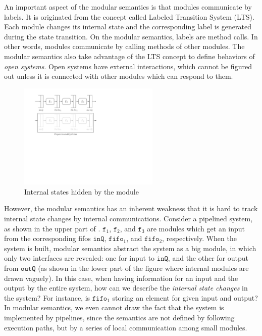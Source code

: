 An important aspect of the modular semantics is that modules
communicate by labels. It is originated from the concept called
Labeled Transition System (LTS). Each module changes its internal
state and the corresponding label is generated during the state
transition. On the modular semantics, labels are method calls. In
other words, modules communicate by calling methods of other modules.
The modular semantics also take advantage of the LTS concept to define
behaviors of \emph{open systems}. Open systems have external
interactions, which cannot be figured out unless it is connected with
other modules which can respond to them.

\begin{figure}[t]
  \centering
  \includegraphics[width=0.6\textwidth]{figures/pipeline-internal.pdf}
  \caption{Internal states hidden by the module}
  \label{ex-modular-semantics-disadvantage}
\end{figure}

However, the modular semantics has an inherent weakness that it is
hard to track internal state changes by internal communications.
Consider a pipelined system, as shown in the upper part of
. $\texttt{f}_1$,
$\texttt{f}_2$, and $\texttt{f}_3$ are modules which get an input from
the corresponding fifos $\texttt{inQ}$, $\texttt{fifo}_1$, and
$\texttt{fifo}_2$, respectively. When the system is built, modular
semantics abstract the system as a big module, in which only two
interfaces are revealed: one for input to $\texttt{inQ}$, and the
other for output from $\texttt{outQ}$ (as shown in the lower part of
the figure where internal modules are drawn vaguely). In this case,
when having information for an input and the output by the entire
system, how can we describe the \emph{internal state changes} in the
system? For instance, is $\texttt{fifo}_1$ storing an element for
given input and output? In modular semantics, we even cannot draw the
fact that the system is implemented by pipelines, since the semantics
are not defined by following execution paths, but by a series of local
communication among small modules.

